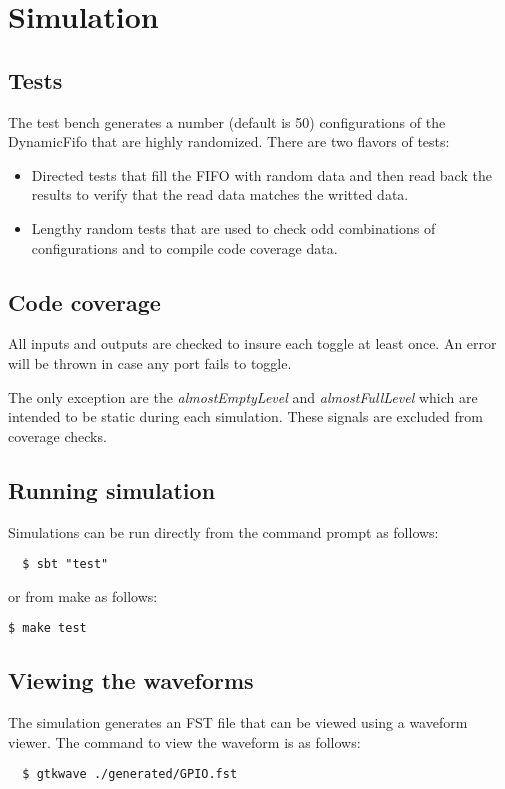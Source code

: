 \section{Simulation}

\subsection{Tests}
The test bench generates a number (default is 50) configurations of the
DynamicFifo that are highly randomized. There are two flavors of tests:

\begin{itemize}
  \item {Directed tests that fill the FIFO with random data and then read back
        the results to verify that the read data matches the writted data.}
  \item {Lengthy random tests that are used to check odd combinations of
        configurations and to compile code coverage data.}
\end{itemize}

\subsection{Code coverage}
All inputs and outputs are checked to insure each toggle at least once. An error
will be thrown in case any port fails to toggle.

The only exception are the \emph{almostEmptyLevel} and \emph{almostFullLevel}
which are intended to be static during each simulation. These signals are
excluded from coverage checks.

\subsection{Running simulation}

Simulations can be run directly from the command prompt as follows:

\begin{verbatim}
  $ sbt "test"
\end{verbatim}

or from make as follows:

\texttt{\$ make test}

\subsection{Viewing the waveforms}

The simulation generates an FST file that can be viewed using a waveform viewer. The command to view the waveform is as follows:
\begin{verbatim}
  $ gtkwave ./generated/GPIO.fst
\end{verbatim}